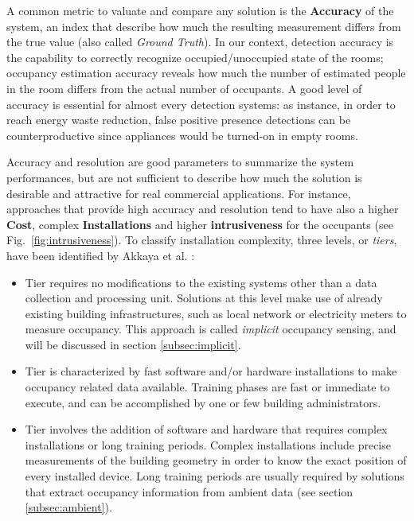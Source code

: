 \medskip
A common metric to valuate and compare any solution is the \textbf{Accuracy} of the system, an index that describe how much the resulting measurement differs from the true value (also called \emph{Ground Truth}). In our context, detection accuracy is the capability to correctly recognize occupied/unoccupied state of the rooms; occupancy estimation accuracy reveals how much the number of estimated people in the room differs from the actual number of occupants. A good level of accuracy is essential for almost every detection systems: as instance, in order to reach energy waste reduction, false positive presence detections can be counterproductive since appliances would be turned-on in empty rooms.

\medskip
Accuracy and resolution are good parameters to summarize the system performances, but are not sufficient to describe how much the solution is desirable and attractive for real commercial applications. For instance, approaches that provide high accuracy and resolution tend to have also a higher \textbf{Cost}, complex \textbf{Installations} and higher \textbf{intrusiveness} for the occupants (see Fig.~\ref{fig:intrusiveness}). To classify installation complexity, three levels, or \emph{tiers}, have been identified by  Akkaya et al. \cite{Akkaya2015}:

\begin{itemize}
  \item Tier  requires no modifications to the existing systems other than a data collection and processing unit. Solutions at this level make use of already existing building infrastructures, such as local network or electricity meters to measure occupancy. This approach is called \emph{implicit} occupancy sensing, and will be discussed in section \ref{subsec:implicit}.
  \item Tier  is characterized by fast software and/or hardware installations to make occupancy related data available. Training phases are fast or immediate to execute, and can be accomplished by one or few building administrators.
  \item Tier  involves the addition of software and hardware that requires complex installations or long training periods. Complex installations include precise measurements of the building geometry in order to know the exact position of every installed device. Long training periods are usually required by solutions that extract occupancy information from ambient data (see section \ref{subsec:ambient}).
\end{itemize}


